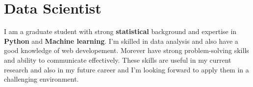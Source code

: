 
\section{Data Scientist}
\small{
    I am a graduate student with strong \textbf{statistical} background and expertise in \textbf{Python} and \textbf{Machine learning}. I'm skilled in data analysis and also have a good knowledge of web developement. Morever have strong problem-solving skills and ability to communicate effectively. These skills are useful in my current research and also in my future career and I'm looking forward to apply them in a challenging environment.
}